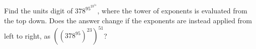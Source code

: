 Find the units digit of $378^{95^{23^{51}}}$, where the tower of exponents is evaluated from the top down. Does the answer change if the exponents are instead applied from left to right, as $\left(\left(378^{95}\right)^{23}\right)^{51}$?
